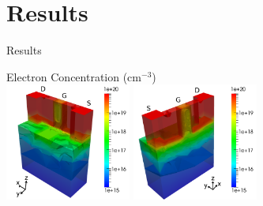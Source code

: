 \documentclass[usepdftitle=false,10pt]{beamer}
\begin{document}
%
%

\section{Results}


\begin{frame}{Results}
  \begin{minipage}{0.99\textwidth}
   \begin{center}
    Electron Concentration (cm$^{-3}$) \\
    \includegraphics[width=0.31\textwidth]{trigate-n-1} \hspace{1cm}
    \includegraphics[width=0.31\textwidth]{trigate-n-2}
   \end{center}
  \end{minipage}
    
  \vspace{0.5cm}
\end{frame}
\end{document}
